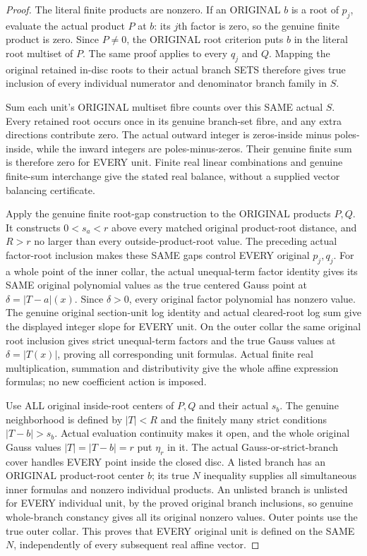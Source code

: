\begin{proof}
The literal finite products are nonzero. If an ORIGINAL $b$ is a root of
$p_j$, evaluate the actual product $P$ at $b$: its $j$th factor is zero,
so the genuine finite product is zero. Since $P\ne0$, the ORIGINAL root
criterion puts $b$ in the literal root multiset of $P$. The same proof
applies to every $q_j$ and $Q$. Mapping the original retained in-disc roots
to their actual branch SETS therefore gives true inclusion of every
individual numerator and denominator branch family in $S$.

Sum each unit's ORIGINAL multiset fibre counts over this SAME actual $S$.
Every retained root occurs once in its genuine branch-set fibre, and any
extra directions contribute zero. The actual outward integer is zeros-inside
minus poles-inside, while the inward integers are poles-minus-zeros.
Their genuine finite sum is therefore zero for EVERY unit. Finite real
linear combinations and genuine finite-sum interchange give the stated
real balance, without a supplied vector balancing certificate.

Apply the genuine finite root-gap construction to the ORIGINAL products
$P,Q$. It constructs $0<s_a<r$ above every matched original product-root
distance, and $R>r$ no larger than every outside-product-root value.
The preceding actual factor-root inclusion makes these SAME gaps control
EVERY original $p_j,q_j$. For a whole point of the inner collar, the actual
unequal-term factor identity gives its SAME original polynomial values as
the true centered Gauss point at $\delta=|T-a|(x)$. Since $\delta>0$,
every original factor polynomial has nonzero value. The genuine original
section-unit log identity and actual cleared-root log sum give the displayed
integer slope for EVERY unit. On the outer collar the same original root
inclusion gives strict unequal-term factors and the true Gauss values at
$\delta=|T(x)|$, proving all corresponding unit formulas. Actual finite
real multiplication, summation and distributivity give the whole affine
expression formulas; no new coefficient action is imposed.

Use ALL original inside-root centers of $P,Q$ and their actual $s_b$.
The genuine neighborhood is defined by $|T|<R$ and the finitely many strict
conditions $|T-b|>s_b$. Actual evaluation continuity makes it open, and
the whole original Gauss values $|T|=|T-b|=r$ put $\eta_r$ in it.
The actual Gauss-or-strict-branch cover handles EVERY point inside the
closed disc. A listed branch has an ORIGINAL product-root center $b$;
its true $N$ inequality supplies all simultaneous inner formulas and
nonzero individual products. An unlisted branch is unlisted for EVERY
individual unit, by the proved original branch inclusions, so genuine
whole-branch constancy gives all its original nonzero values. Outer points
use the true outer collar. This proves that EVERY original unit is defined
on the SAME $N$, independently of every subsequent real affine vector.


\end{proof}
